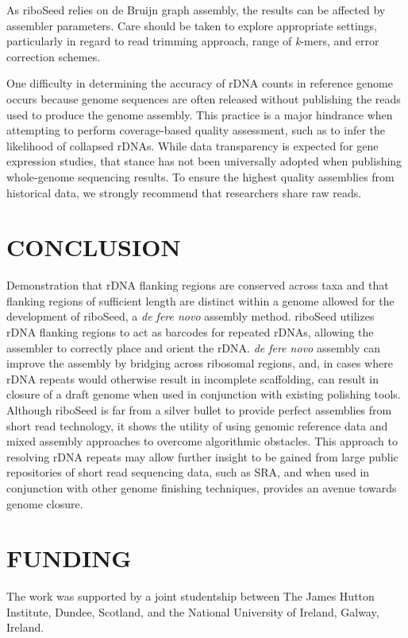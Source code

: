 \documentclass[a4,center,fleqn]{NAR}
\begin{document}
As riboSeed relies on de Bruijn graph assembly, the results can be affected by assembler parameters. Care should be taken to explore appropriate settings, particularly in regard to read trimming approach, range of \textit{k}-mers, and error correction schemes.

One difficulty in determining the accuracy of rDNA counts in reference genome occurs because genome sequences are often released without publishing the reads used to produce the genome assembly. This practice is a major hindrance when attempting to perform coverage-based quality assessment, such as to infer the likelihood of collapsed rDNAs. While data transparency is expected for gene expression studies, that stance has not been universally adopted when publishing whole-genome sequencing results. To ensure the highest quality assemblies from historical data, we strongly recommend that researchers share raw reads.


\section*{CONCLUSION}
Demonstration that rDNA flanking regions are conserved across taxa and that flanking regions of sufficient length are distinct within a genome allowed for the development of riboSeed, a \textit{de fere novo} assembly method. riboSeed  utilizes rDNA flanking regions to act as barcodes for repeated rDNAs, allowing the assembler to correctly place and orient the rDNA. \textit{de fere novo} assembly can improve the assembly by bridging across ribosomal regions, and, in cases where rDNA repeats would otherwise result in incomplete scaffolding, can result in closure of a draft genome when used in conjunction with existing polishing tools. Although riboSeed is far from a silver bullet to provide perfect assemblies from short read technology, it shows the utility of using genomic reference data and mixed assembly approaches to overcome algorithmic obstacles. This approach to resolving rDNA repeats may allow further insight to be gained from large public repositories of short read sequencing data, such as SRA, and when used in conjunction with other genome finishing techniques, provides an avenue towards genome closure.

\section{FUNDING}
The work was supported by a joint studentship between The James Hutton Institute, Dundee, Scotland, and the National University of Ireland, Galway, Ireland.
\end{document}
